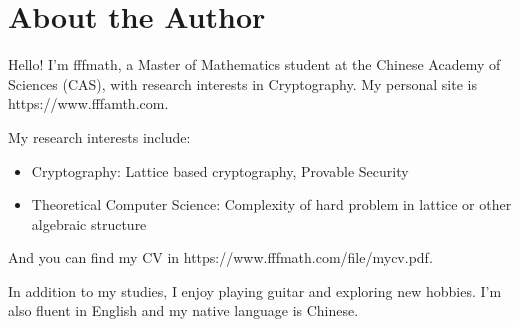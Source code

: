 \chapter{About the Author}

Hello! I'm fffmath, a Master of Mathematics student at the Chinese Academy of Sciences (CAS), with research interests in Cryptography. My personal site is https://www.fffamth.com.

My research interests include:
\begin{itemize}
    \item Cryptography: Lattice based cryptography, Provable Security
    \item Theoretical Computer Science: Complexity of hard problem in lattice or other algebraic structure
\end{itemize}
And you can find my CV in https://www.fffmath.com/file/mycv.pdf.

In addition to my studies, I enjoy playing guitar and exploring new hobbies. I’m also fluent in English and my native language is Chinese.

